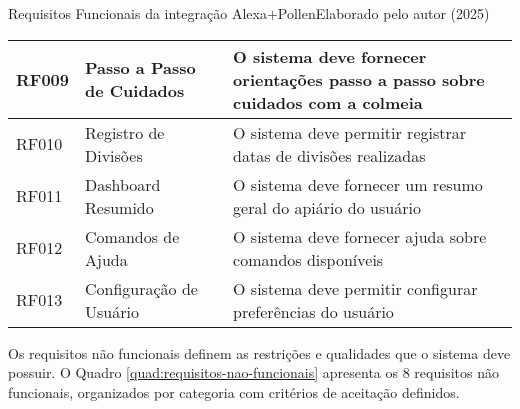 \begin{quadro}{Requisitos Funcionais da integração Alexa+Pollen}{Elaborado pelo autor (2025)}
{\begin{tabular}{|l|p{3.5cm}|p{9cm}|}
RF009 & Passo a Passo de Cuidados & O sistema deve fornecer orientações passo a passo sobre cuidados com a colmeia \\ \hline

RF010 & Registro de Divisões & O sistema deve permitir registrar datas de divisões realizadas \\ \hline

RF011 & Dashboard Resumido & O sistema deve fornecer um resumo geral do apiário do usuário \\ \hline

RF012 & Comandos de Ajuda & O sistema deve fornecer ajuda sobre comandos disponíveis \\ \hline

RF013 & Configuração de Usuário & O sistema deve permitir configurar preferências do usuário \\ \hline

\end{tabular}
}
\end{quadro}


Os requisitos não funcionais definem as restrições e qualidades que o sistema deve possuir. O Quadro \ref{quad:requisitos-nao-funcionais} apresenta os 8 requisitos não funcionais, organizados por categoria com critérios de aceitação definidos.

